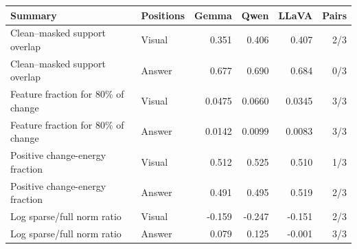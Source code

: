 \begin{samepage}
\begin{center}
\begin{minipage}{\linewidth}
\captionsetup{type=table,hypcap=false}
\caption{\textbf{The structures seen by the sparse tools differ across models.} Values are model means on the same 240 images. ``Pairs'' counts how many of the three paired model comparisons remain different after the joint correction of 72 tests. These summaries describe each fitted tool and do not align feature identities across models.}
\label{tab:sparse-structure-summary}
\centering
\small
\setlength{\tabcolsep}{2.2pt}
\begin{tabular*}{\linewidth}{@{\extracolsep{\fill}}llrrrr@{}}
\toprule
Summary & Positions & Gemma & Qwen & LLaVA & Pairs \\
\midrule
Clean--masked support overlap & Visual & 0.351 & 0.406 & 0.407 & 2/3 \\
Clean--masked support overlap & Answer & 0.677 & 0.690 & 0.684 & 0/3 \\
Feature fraction for 80\% of change & Visual & 0.0475 & 0.0660 & 0.0345 & 3/3 \\
Feature fraction for 80\% of change & Answer & 0.0142 & 0.0099 & 0.0083 & 3/3 \\
Positive change-energy fraction & Visual & 0.512 & 0.525 & 0.510 & 1/3 \\
Positive change-energy fraction & Answer & 0.491 & 0.495 & 0.519 & 2/3 \\
Log sparse/full norm ratio & Visual & -0.159 & -0.247 & -0.151 & 2/3 \\
Log sparse/full norm ratio & Answer & 0.079 & 0.125 & -0.001 & 3/3 \\
\bottomrule
\end{tabular*}
\end{minipage}
\end{center}
\end{samepage}
